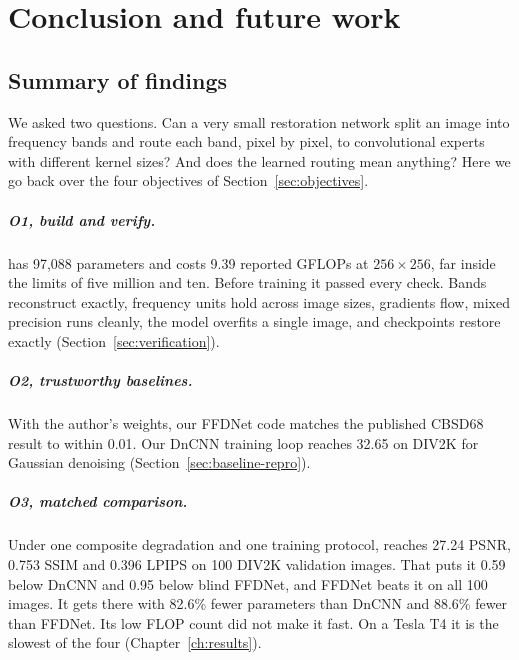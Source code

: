 \chapter{Conclusion and future work}\label{ch:conclusion}

\section{Summary of findings}\label{sec:summary}

We asked two questions. Can a very small restoration network split an image
into frequency bands and route each band, pixel by pixel, to convolutional
experts with different kernel sizes? And does the learned routing mean
anything? Here we go back over the four objectives of
Section~\ref{sec:objectives}.

\paragraph{O1, build and verify.} \fcsg{} has 97,088 parameters and costs
9.39 reported GFLOPs at $256\times256$, far inside the limits of five million
and ten. Before training it passed every check. Bands reconstruct exactly,
frequency units hold across image sizes, gradients flow, mixed precision runs
cleanly, the model overfits a single image, and checkpoints restore exactly
(Section~\ref{sec:verification}).

\paragraph{O2, trustworthy baselines.} With the author's weights, our FFDNet
code matches the published CBSD68 result to within 0.01\dB{}. Our DnCNN
training loop reaches 32.65\dB{} on DIV2K for Gaussian denoising
(Section~\ref{sec:baseline-repro}).

\paragraph{O3, matched comparison.} Under one composite degradation and one
training protocol, \fcsg{} reaches 27.24\dB{} PSNR, 0.753 SSIM and 0.396
LPIPS on 100 DIV2K validation images. That puts it 0.59\dB{} below DnCNN and
0.95\dB{} below blind FFDNet, and FFDNet beats it on all 100 images. It gets
there with 82.6\% fewer parameters than DnCNN and 88.6\% fewer than FFDNet.
Its low FLOP count did not make it fast. On a Tesla T4 it is the slowest of
the four (Chapter~\ref{ch:results}).

